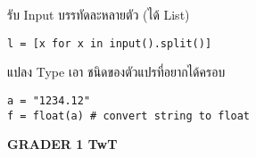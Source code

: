 \documentclass[11pt,a4paper,twocolumn]{article}
\begin{document}
รับ Input บรรทัดละหลายตัว (ได้ List)
\vspace{-2.5ex}
\begin{verbatim}
l = [x for x in input().split()]
\end{verbatim}
\vspace{-1ex}

แปลง Type เอา ชนิดของตัวแปรที่อยากได้ครอบ
\vspace{-2.5ex}
\begin{verbatim}
a = "1234.12"
f = float(a) # convert string to float
\end{verbatim}
\vspace{-1ex}

\begin{center}
\textbf{GRADER 1 TwT}
\end{center}
\end{document}
